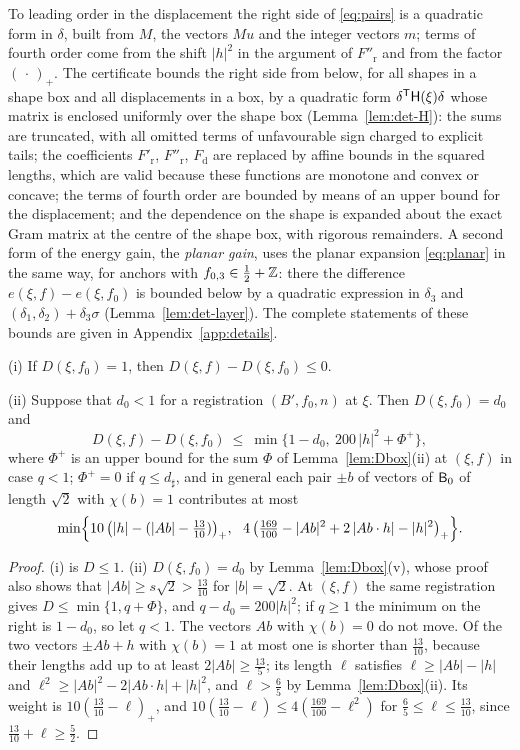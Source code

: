 To leading order in the displacement the right side of \eqref{eq:pairs} is a quadratic form in $\delta$, built from $M$, the vectors
$Mu$ and the integer vectors $m$; terms of fourth order come from the shift $|h|^2$ in the argument of $F''_{\mathrm r}$ and from the
factor $(\,\cdot\,)_+$. The certificate bounds the right side from below, for all shapes in a shape box and all displacements in a
box, by a quadratic form $\delta^\mathsf T\mathsf H(\xi)\delta$ whose matrix is enclosed uniformly over the shape box
(Lemma~\ref{lem:det-H}): the sums are truncated, with all omitted terms of unfavourable sign charged to explicit tails; the
coefficients $F'_{\mathrm r}$, $F''_{\mathrm r}$, $F_{\mathrm d}$ are replaced by affine bounds in the squared lengths, which are valid
because these functions are monotone and convex or concave; the terms of fourth order are bounded by means of an upper bound for
the displacement; and the dependence on the shape is expanded about the exact Gram matrix at the centre of the shape box, with
rigorous remainders. A second form of the energy gain, the \emph{planar gain}, uses the planar expansion \eqref{eq:planar} in the
same way, for anchors with $f_{0,3}\in\frac12+\mathbb Z$: there the difference $e(\xi,f)-e(\xi,f_0)$ is bounded below by a quadratic
expression in $\delta_3$ and $(\delta_1,\delta_2)+\delta_3\sigma$ (Lemma~\ref{lem:det-layer}). The complete statements of these
bounds are given in Appendix~\ref{app:details}.

\begin{lemma}\label{lem:growth}
\textup{(i)} If $D(\xi,f_0)=1$, then $D(\xi,f)-D(\xi,f_0)\le0$.

\textup{(ii)} Suppose that $d_0<1$ for a registration $(B',f_0,n)$ at $\xi$. Then $D(\xi,f_0)=d_0$ and
\[
  D(\xi,f)-D(\xi,f_0)\ \le\ \min\bigl\{1-d_0,\ 200\,|h|^2+\Phi^+\bigr\},
\]
where $\Phi^+$ is an upper bound for the sum $\Phi$ of Lemma~\ref{lem:Dbox}\textup{(ii)} at $(\xi,f)$ in case $q<1$; $\Phi^+=0$ if
$q\le d_\sharp$, and in general each pair $\pm b$ of vectors of $\mathsf B_0$ of length $\sqrt2$ with $\chi(b)=1$ contributes at most
\[
  \min\Bigl\{10\,\bigl(|h|-(|Ab|-\tfrac{13}{10})\bigr)_+,\ \ 4\,\bigl(\tfrac{169}{100}-|Ab|^2+2\,|Ab\cdot h|-|h|^2\bigr)_+\Bigr\}.
\]
\end{lemma}

\begin{proof}
(i) is $D\le1$.
(ii) $D(\xi,f_0)=d_0$ by Lemma~\ref{lem:Dbox}(v), whose proof also shows that $|Ab|\ge s\sqrt2>\frac{13}{10}$ for $|b|=\sqrt2$. At
$(\xi,f)$ the same registration gives $D\le\min\{1,q+\Phi\}$, and $q-d_0=200|h|^2$; if $q\ge1$ the minimum on the right is
$1-d_0$, so let $q<1$. The vectors $Ab$ with $\chi(b)=0$ do not move. Of the two vectors $\pm Ab+h$ with $\chi(b)=1$ at most one is
shorter than $\frac{13}{10}$, because their lengths add up to at least $2|Ab|\ge\frac{13}5$; its length $\ell$ satisfies
$\ell\ge|Ab|-|h|$ and $\ell^2\ge|Ab|^2-2|Ab\cdot h|+|h|^2$, and $\ell>\frac65$ by Lemma~\ref{lem:Dbox}(ii). Its weight is
$10(\frac{13}{10}-\ell)_+$, and $10(\frac{13}{10}-\ell)\le4(\frac{169}{100}-\ell^2)$ for $\frac65\le\ell\le\frac{13}{10}$, since
$\frac{13}{10}+\ell\ge\frac52$.
\end{proof}

